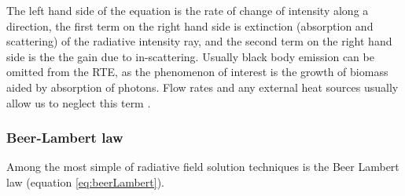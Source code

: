 The left hand side of the equation is the rate of change of intensity along a direction, the first term on the right hand side is extinction (absorption and scattering) of the radiative intensity ray, and the second term on the right hand side is the the gain due to in-scattering. Usually black body emission can be omitted from the RTE, as the phenomenon of interest is the growth of biomass aided by absorption of photons. Flow rates and any external heat sources usually allow us to neglect this term \cite{Lee1994}.


\subsubsection{Beer-Lambert law}
\label{S:2.3.1}
Among the most simple of radiative field solution techniques is the Beer Lambert law (equation \ref{eq:beerLambert}). 


